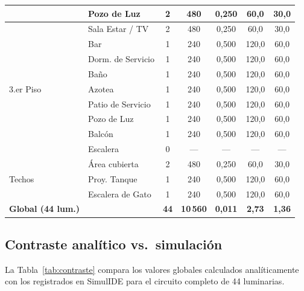 \begin{table}[H]
\begin{tabular}{llccccc}
 & Pozo de Luz            & 2 &  480 & 0{,}250 &  60{,}0 & 30{,}0 \\
\midrule
\multirow{9}{*}{3.er Piso}
 & Sala Estar / TV        & 2 &  480 & 0{,}250 &  60{,}0 & 30{,}0 \\
 & Bar                    & 1 &  240 & 0{,}500 & 120{,}0 & 60{,}0 \\
 & Dorm. de Servicio      & 1 &  240 & 0{,}500 & 120{,}0 & 60{,}0 \\
 & Baño                   & 1 &  240 & 0{,}500 & 120{,}0 & 60{,}0 \\
 & Azotea                 & 1 &  240 & 0{,}500 & 120{,}0 & 60{,}0 \\
 & Patio de Servicio      & 1 &  240 & 0{,}500 & 120{,}0 & 60{,}0 \\
 & Pozo de Luz            & 1 &  240 & 0{,}500 & 120{,}0 & 60{,}0 \\
 & Balcón                 & 1 &  240 & 0{,}500 & 120{,}0 & 60{,}0 \\
 & Escalera               & 0 &   —  &    —    &     —   &    —   \\
\midrule
\multirow{3}{*}{Techos}
 & Área cubierta          & 2 &  480 & 0{,}250 &  60{,}0 & 30{,}0 \\
 & Proy. Tanque           & 1 &  240 & 0{,}500 & 120{,}0 & 60{,}0 \\
 & Escalera de Gato       & 1 &  240 & 0{,}500 & 120{,}0 & 60{,}0 \\
\midrule
\textbf{Global (44 lum.)} & & \textbf{44} & \textbf{10\,560} & \textbf{0{,}011} & \textbf{2{,}73} & \textbf{1{,}36} \\
\bottomrule
\end{tabular}
\end{table}

\subsection{Contraste analítico vs.\ simulación}

La Tabla~\ref{tab:contraste} compara los valores globales calculados analíticamente con los registrados en SimulIDE para el circuito completo de 44 luminarias.

